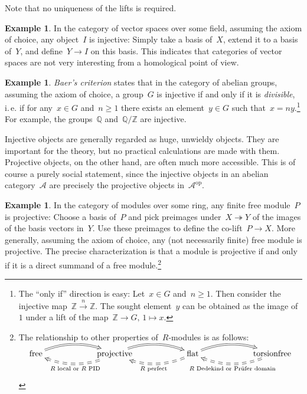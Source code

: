 \documentclass{amsart}
\makeatletter
\theoremstyle{definition}
\newtheorem{ex}[defn]{Example}
\theoremstyle{plain}
\theoremstyle{remark}
\newcommand{\ZZ}{\mathbb{Z}}
\newcommand{\A}{\mathcal{A}}
\newcommand{\QQ}{\mathbb{Q}}
\newcommand{\op}{\mathrm{op}}
\newcommand{\?}{\,{:}\,}
\renewcommand{\_}{\mathpunct{.}\,}
\newcommand{\ie}{i.\,e.\@\xspace}
\makeatother
\begin{document}
Note that no uniqueness of the lifts is required.

\begin{ex}In the category of vector spaces over some field, assuming the axiom
of choice, any object~$I$ is injective: Simply take a basis of~$X$, extend it to a
basis of~$Y$, and define~$Y \to I$ on this basis. This indicates
that categories of vector spaces are not very interesting
from a homological point of view.\end{ex}

\begin{ex}\emph{Baer's criterion} states that in the category of abelian
groups, assuming the axiom of choice, a group~$G$ is injective if and only if
it is \emph{divisible}, \ie if for any~$x \in G$ and~$n \geq 1$ there exists an
element~$y \in G$ such that~$x = ny$.\footnote{The ``only if'' direction is
easy: Let~$x \in G$ and~$n \geq 1$. Then consider the injective map~$\ZZ
\xrightarrow{n} \ZZ$. The sought element~$y$ can be obtained as the image
of~$1$ under a lift of the map~$\ZZ \to G,\,1 \mapsto x$.} For example, the
groups~$\QQ$ and~$\QQ/\ZZ$ are injective.
\end{ex}

Injective objects are generally regarded as huge, unwieldy objects. They are
important for the theory, but no practical calculations are made with them.
Projective objects, on the other hand, are often much more accessible. This is
of course a purely social statement, since the injective objects in an abelian
category~$\A$ are precisely the projective objects in~$\A^\op$.

\begin{ex}In the category of modules over some ring, any finite free module~$P$ is
projective: Choose a basis of~$P$ and pick preimages under~$X
\twoheadrightarrow Y$ of the images of the basis vectors in~$Y$. Use these
preimages to define the co-lift~$P \to X$. More generally, assuming the axiom
of choice, any (not necessarily finite) free module is projective. The precise
characterization is that a module is projective if and only if it is a direct
summand of a free module.\footnote{The relationship to other properties
of~$R$-modules is as follows: \\
\[ \xymatrixcolsep{5pc}\xymatrix{
  \text{free} \ar@/^1pc/@{=>}[r] &
  \text{projective} \ar@/^1pc/@{=>}[r] \ar@/^1pc/@{==>}[l]^{\text{$R$ local
  or $R$ PID}} &
  \text{flat} \ar@/^1pc/@{=>}[r] \ar@/^1pc/@{==>}[l]^{\text{$R$ perfect}} &
  \text{torsionfree} \ar@/^1pc/@{==>}[l]^{\text{$R$ Dedekind or Prüfer domain}}
} \]\vspace{-1.6em}}\end{ex}
\end{document}
